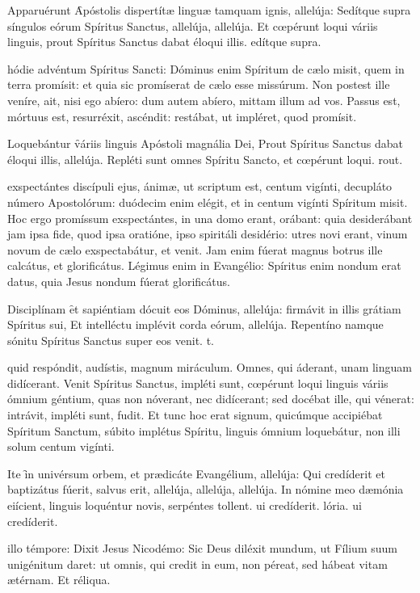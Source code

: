 \documentclass[fontsize=9pt,paper=A6,twoside,BCOR=1mm,DIV=22,headinclude]{scrarticle}
\begin{document}
\begin{multicols}{2}
\R Apparuérunt \f Apóstolis dispertítæ linguæ tamquam ignis, allelúja:
\red{*} Sedítque supra síngulos eórum Spíritus Sanctus, allelúja, allelúja.
\V Et cœpérunt loqui váriis linguis, prout Spíritus Sanctus dabat éloqui illis.
edítque supra.

 hódie advéntum Spíritus Sancti: Dóminus enim Spíritum de cælo misit, quem in terra promísit: et quia sic promíserat de cælo esse missúrum. Non postest ille veníre, ait, nisi ego abíero: dum autem abíero, mittam illum ad vos. Passus est, mórtuus est, resurréxit, ascéndit: restábat, ut impléret, quod promísit.

\R Loquebántur \f váriis linguis Apóstoli magnália Dei,
\red{*} Prout Spíritus Sanctus dabat éloqui illis, allelúja.
\V Repléti sunt omnes Spíritu Sancto, et cœpérunt loqui.
rout.

 exspectántes discípuli ejus, ánimæ, ut scriptum est, centum vigínti, decupláto número Apostolórum: duódecim enim elégit, et in centum vigínti Spíritum misit. Hoc ergo promíssum exspectántes, in una domo erant, orábant: quia desiderábant jam ipsa fide, quod ipsa oratióne, ipso spiritáli desidério: utres novi erant, vinum novum de cælo exspectabátur, et venit. Jam enim fúerat magnus botrus ille calcátus, et glorificátus. Légimus enim in Evangélio: Spíritus enim nondum erat datus, quia Jesus nondum fúerat glorificátus.

\R Disciplínam \f et sapiéntiam dócuit eos Dóminus, allelúja: firmávit in illis grátiam Spíritus sui,
\red{*} Et intelléctu implévit corda eórum, allelúja.
\V Repentíno namque sónitu Spíritus Sanctus super eos venit.
t.

 quid respóndit, audístis, magnum miráculum. Omnes, qui áderant, unam linguam didícerant. Venit Spíritus Sanctus, impléti sunt, cœpérunt loqui linguis váriis ómnium géntium, quas non nóverant, nec didícerant; sed docébat ille, qui vénerat: intrávit, impléti sunt, fudit. Et tunc hoc erat signum, quicúmque accipiébat Spíritum Sanctum, súbito implétus Spíritu, linguis ómnium loquebátur, non illi solum centum vigínti.

\R Ite \f in univérsum orbem, et prædicáte Evangélium, allelúja:
\red{*} Qui credíderit et baptizátus fúerit, salvus erit, allelúja, allelúja, allelúja.
\V In nómine meo dæmónia eiícient, linguis loquéntur novis, serpéntes tollent.
ui credíderit.
lória.
ui credíderit.

 illo témpore: Dixit Jesus Nicodémo: Sic Deus diléxit mundum, ut Fílium suum unigénitum daret: ut omnis, qui credit in eum, non péreat, sed hábeat vitam ætérnam. Et réliqua.


\end{multicols}
\end{document}
